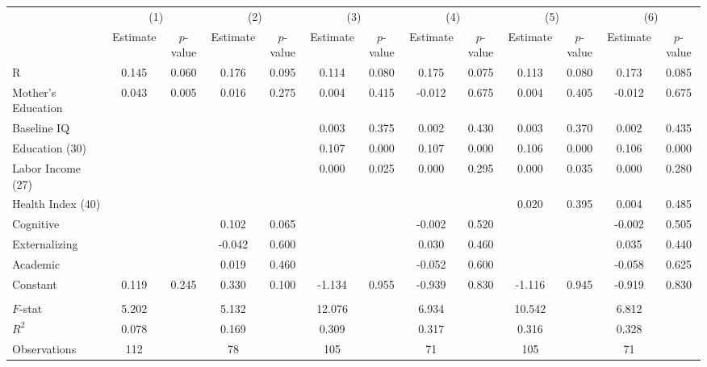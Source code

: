 \begin{tabular}{lcccccccccccc} \toprule
 & \multicolumn{2}{c}{(1)}  &  \multicolumn{2}{c}{(2)}  &  \multicolumn{2}{c}{(3)}  &  \multicolumn{2}{c}{(4)}  & \multicolumn{2}{c}{(5)} & \multicolumn{2}{c}{(6)} \\  
 & Estimate & $p$-value & Estimate & $p$-value & Estimate & $p$-value & Estimate & $p$-value & Estimate & $p$-value & Estimate & $p$-value \\ \midrule
R &     0.145 &     0.060 &     0.176 &     0.095 &     0.114 &     0.080 &     0.175 &     0.075 &     0.113 &     0.080 &     0.173 &     0.085 \\  
Mother's Education &     0.043 &     0.005 &     0.016 &     0.275 &     0.004 &     0.415 &    -0.012 &     0.675 &     0.004 &     0.405 &    -0.012 &     0.675 \\  
Baseline IQ  &         &         &         &         &     0.003 &     0.375 &     0.002 &     0.430 &     0.003 &     0.370 &     0.002 &     0.435 \\  
Education (30) &         &         &         &         &     0.107 &     0.000 &     0.107 &     0.000 &     0.106 &     0.000 &     0.106 &     0.000 \\  
Labor Income (27) &         &         &         &         &     0.000 &     0.025 &     0.000 &     0.295 &     0.000 &     0.035 &     0.000 &     0.280 \\  
Health Index (40)  &         &         &         &         &         &         &         &         &     0.020 &     0.395 &     0.004 &     0.485 \\  
Cognitive  &         &         &     0.102 &     0.065 &         &         &    -0.002 &     0.520 &         &         &    -0.002 &     0.505 \\  
Externalizing  &         &         &    -0.042 &     0.600 &         &         &     0.030 &     0.460 &         &         &     0.035 &     0.440 \\  
Academic  &         &         &     0.019 &     0.460 &         &         &    -0.052 &     0.600 &         &         &    -0.058 &     0.625 \\  
Constant  &     0.119 &     0.245 &     0.330 &     0.100 &    -1.134 &     0.955 &    -0.939 &     0.830 &    -1.116 &     0.945 &    -0.919 &     0.830 \\  \\ \midrule
$F$-stat &     5.202 &     &     5.132 &     &    12.076 &      &     6.934 &      &    10.542 &      &     6.812 &      \\  
$R^2$ &     0.078 &      &     0.169 &     &     0.309 &     &     0.317 &    &     0.316 &    &     0.328 &     \\  
Observations &   112 &     &    78 &   &   105 &  &    71 &&   105 &    &    71 &   \\  
\bottomrule \end{tabular}
